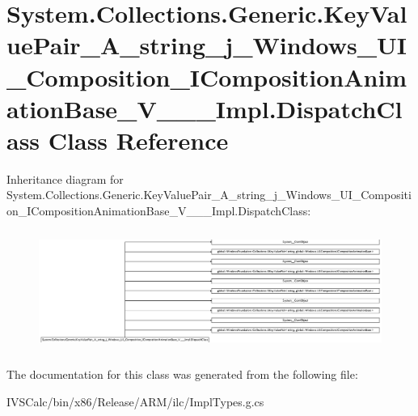 \hypertarget{class_system_1_1_collections_1_1_generic_1_1_key_value_pair___a__string__j___windows___u_i___com000c03b9472956dbbe2c4f87d3c101e9}{}\section{System.\+Collections.\+Generic.\+Key\+Value\+Pair\+\_\+\+A\+\_\+string\+\_\+j\+\_\+\+Windows\+\_\+\+U\+I\+\_\+\+Composition\+\_\+\+I\+Composition\+Animation\+Base\+\_\+\+V\+\_\+\+\_\+\+\_\+\+Impl.\+Dispatch\+Class Class Reference}
\label{class_system_1_1_collections_1_1_generic_1_1_key_value_pair___a__string__j___windows___u_i___com000c03b9472956dbbe2c4f87d3c101e9}
Inheritance diagram for System.\+Collections.\+Generic.\+Key\+Value\+Pair\+\_\+\+A\+\_\+string\+\_\+j\+\_\+\+Windows\+\_\+\+U\+I\+\_\+\+Composition\+\_\+\+I\+Composition\+Animation\+Base\+\_\+\+V\+\_\+\+\_\+\+\_\+\+Impl.\+Dispatch\+Class\+:\begin{figure}[H]
\begin{center}
\leavevmode
\includegraphics[height=3.974194cm]{class_system_1_1_collections_1_1_generic_1_1_key_value_pair___a__string__j___windows___u_i___com000c03b9472956dbbe2c4f87d3c101e9}
\end{center}
\end{figure}


The documentation for this class was generated from the following file\+:\begin{DoxyCompactItemize}
\item 
I\+V\+S\+Calc/bin/x86/\+Release/\+A\+R\+M/ilc/Impl\+Types.\+g.\+cs\end{DoxyCompactItemize}
